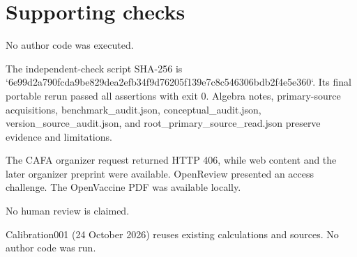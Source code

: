 \documentclass[10pt]{article}
\begin{document}
\section*{Supporting checks}
No author code was executed.\par
The independent-check script SHA-256 is `6e99d2a790fcda9be829dea2efb34f9d76205f139e7c8c546306bdb2f4e5e360`. Its final portable rerun passed all assertions with exit 0. Algebra notes, primary-source acquisitions, benchmark\_audit.json, conceptual\_audit.json, version\_source\_audit.json, and root\_primary\_source\_read.json preserve evidence and limitations.\par
The CAFA organizer request returned HTTP 406, while web content and the later organizer preprint were available. OpenReview presented an access challenge. The OpenVaccine PDF was available locally.\par
No human review is claimed.\par
Calibration001 (24 October 2026) reuses existing calculations and sources. No author code was run.\par
\end{document}
